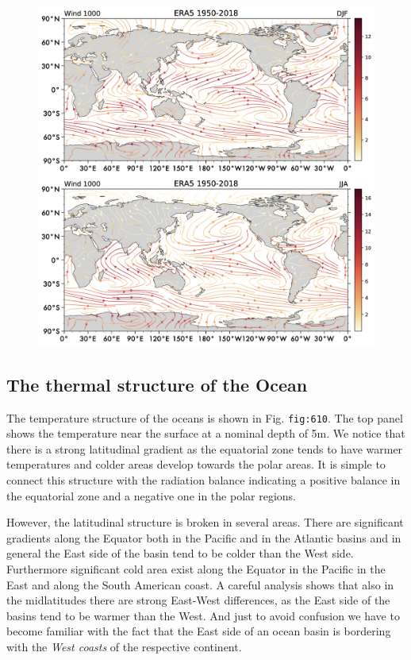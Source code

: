 \begin{figure}
\centering
\includegraphics[width = .7 \textwidth]{figs/GD/Wind1000.png}
\caption{} \label{fig:}
\end{figure}

\subsection{The thermal structure of the
Ocean}\label{the-thermal-structure-of-the-ocean}

The temperature structure of the oceans is shown in Fig.
\texttt{fig:610}. The top panel shows the temperature near the surface
at a nominal depth of 5m. We notice that there is a strong latitudinal
gradient as the equatorial zone tends to have warmer temperatures and
colder areas develop towards the polar areas. It is simple to connect
this structure with the radiation balance indicating a positive balance
in the equatorial zone and a negative one in the polar regions.

However, the latitudinal structure is broken in several areas. There are
significant gradients along the Equator both in the Pacific and in the
Atlantic basins and in general the East side of the basin tend to be
colder than the West side. Furthermore significant cold area exist along
the Equator in the Pacific in the East and along the South American
coast. A careful analysis shows that also in the midlatitudes there are
strong East-West differences, as the East side of the basins tend to be
warmer than the West. And just to avoid confusion we have to become
familiar with the fact that the East side of an ocean basin is bordering
with the \emph{West coasts} of the respective continent.

